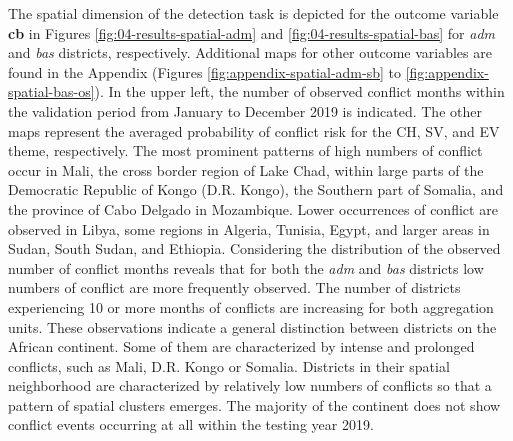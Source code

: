 \documentclass[a4paper,11pt]{article}
\begin{document}
The spatial dimension of the detection task is depicted for the outcome variable
\textbf{cb} in Figures \ref{fig:04-results-spatial-adm} and \ref{fig:04-results-spatial-bas}
for \emph{adm} and \emph{bas} districts, respectively.
Additional maps for other outcome variables are found in the Appendix
(Figures \ref{fig:appendix-spatial-adm-sb} to \ref{fig:appendix-spatial-bas-os}).
In the upper left, the number of observed conflict months within the validation
period from January to December 2019 is indicated.
The other maps represent the averaged probability of conflict risk for the CH,
SV, and EV theme, respectively. The most prominent patterns of high numbers of
conflict occur in Mali, the cross border region of Lake Chad, within large parts
of the Democratic Republic of Kongo (D.R. Kongo), the Southern
part of Somalia, and the province of Cabo Delgado in Mozambique. Lower occurrences
of conflict are observed in Libya, some regions in Algeria, Tunisia, Egypt, and
larger areas in Sudan, South Sudan, and Ethiopia. Considering the distribution
of the observed number of conflict months reveals that for both the \emph{adm} and \emph{bas}
districts low numbers of conflict are more frequently observed. The number of
districts experiencing 10 or more months of conflicts are increasing for both
aggregation units. These observations indicate a general distinction between
districts on the African continent. Some of them are characterized by intense and
prolonged conflicts, such as Mali, D.R. Kongo or Somalia. Districts in their spatial
neighborhood are characterized by relatively low numbers of conflicts so that
a pattern of spatial clusters emerges. The majority of the continent does not
show conflict events occurring at all within the testing year 2019.
\end{document}
